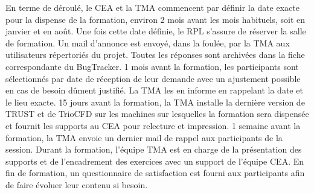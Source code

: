 En terme de déroulé, le CEA et la TMA commencent par définir la date exacte pour la dispense de la formation, environ 2 mois avant les mois habituels, soit en janvier et en août. Une fois cette date définie, le RPL s'assure de réserver la salle de formation. Un mail d'annonce est  envoyé, dans la foulée, par la TMA aux utilisateurs répertoriés du projet. Toutes les réponses sont archivées dans la fiche correspondante du BugTracker. 1 mois avant la formation, les participants sont sélectionnés par date de réception de leur demande avec un ajustement possible en cas de besoin dûment justifié. La TMA les en informe en rappelant la date et le lieu exacte. 15 jours avant la formation, la TMA installe la dernière version de TRUST et de TrioCFD sur les machines sur lesquelles la formation sera dispensée et fournit les supports au CEA pour relecture et impression. 1 semaine avant la formation, la TMA envoie un dernier mail de rappel aux participants de la session. Durant la formation, l'équipe TMA est en charge de la présentation des supports et de l'encadrement des exercices avec un support de l'équipe CEA. En fin de formation, un questionnaire de satisfaction est fourni aux participants afin de faire évoluer leur contenu si besoin.








